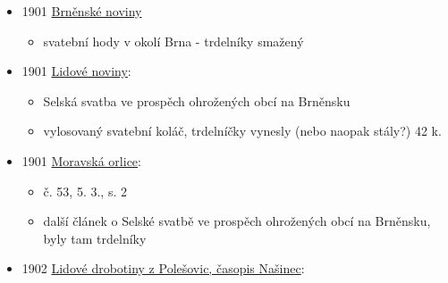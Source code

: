 \begin{itemize}
  \begin{itemize}
  \tightlist
  \item
    je to digitalizovaný pod Podrobný seznam slov Rukopisu
    Kralodvorského z roku 1897, takže byly svázaný dvě knihy do jednoho
    svazku
  \item
    heslo trdelník:

    \begin{itemize}
    \tightlist
    \item
      těsto se vyválí na provázky, natočí na horký dřevěný trdlo,
      pomastí vejčetem, posype tlučenýma ořechama. Šeb, 110
    \item
      cituje Lidské dokumenty od Šebestové z roku 1900, takže to
      očividně nevyšlo v roce 1897
    \end{itemize}
  \end{itemize}
\item
  1901
  \href{https://ndk.cz/view/uuid:c714e5a0-81eb-11e3-a70e-005056822549?page=uuid\%3A884b7690-8641-11e3-b315-001018b5eb5c&fulltext=trdeln\%C3\%ADky}{Brněnské
  noviny}

  \begin{itemize}
  \tightlist
  \item
    svatební hody v okolí Brna - trdelníky smažený
  \end{itemize}
\item
  1901
  \href{https://www.digitalniknihovna.cz/vkol/uuid/uuid:b7bf269e-435d-11dd-b505-00145e5790ea}{Lidové
  noviny}:

  \begin{itemize}
  \tightlist
  \item
    Selská svatba ve prospěch ohrožených obcí na Brněnsku
  \item
    vylosovaný svatební koláč, trdelníčky vynesly (nebo naopak stály?)
    42 k.
  \end{itemize}
\item
  1901
  \href{https://www.digitalniknihovna.cz/mzk/uuid/uuid:055dd9bd-32f0-11de-992b-00145e5790ea}{Moravská
  orlice}:

  \begin{itemize}
  \tightlist
  \item
    č. 53, 5. 3., s. 2
  \item
    další článek o Selské svatbě ve prospěch ohrožených obcí na
    Brněnsku, byly tam trdelníky
  \end{itemize}
\item
  1902
  \href{https://ceskadigitalniknihovna.cz/view/uuid:51ede477-8259-11e0-b92b-0050569d679d?page=uuid\%3A540811e9-8259-11e0-b92b-0050569d679d&fulltext=trdeln\%C3\%ADk\%20OR\%20trdeln\%C3\%ADky\%20OR\%20trdeln\%C3\%ADk\%C5\%AF&source=mzk}{Lidové
  drobotiny z Polešovic, časopis Našinec}:


\end{itemize}
